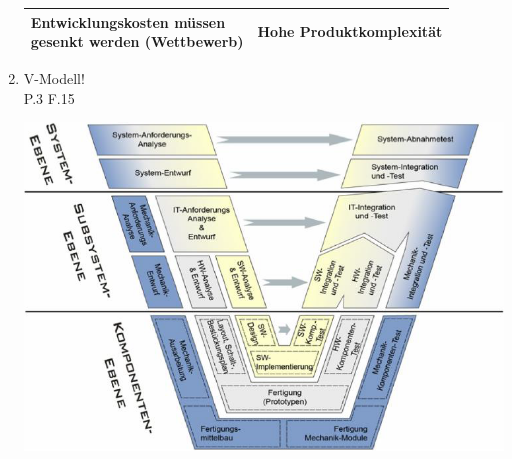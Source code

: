 \documentclass[10pt,a4paper,fleqn]{article}
\begin{document}
\begin{enumerate}
\begin{center}
\begin{tabular}{|l|l|}
					\hline 
					\pbox{20cm}{ Entwicklungskosten müssen \\ gesenkt werden (Wettbewerb) } &  Hohe Produktkomplexität \\ 
					\hline 
				\end{tabular}
			\end{center}
	\item V-Modell!\\
		P.3 F.15\\
		\begin{center}
			\includegraphics[scale=0.5]{v.png}
		\end{center}
\pagebreak

\end{enumerate}
\end{document}
